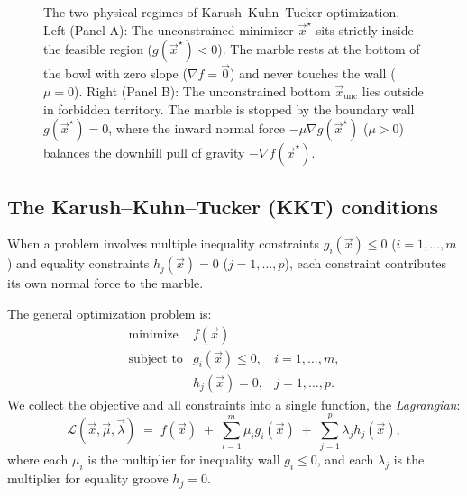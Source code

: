 \begin{figure}[H]
\caption{The two physical regimes of Karush--Kuhn--Tucker optimization. Left (Panel A): The unconstrained minimizer $\vec{x}^\star$ sits strictly inside the feasible region ($g(\vec{x}^\star) < 0$). The marble rests at the bottom of the bowl with zero slope ($\nabla f = \vec{0}$) and never touches the wall ($\mu = 0$). Right (Panel B): The unconstrained bottom $\vec{x}_{\text{unc}}$ lies outside in forbidden territory. The marble is stopped by the boundary wall $g(\vec{x}^\star) = 0$, where the inward normal force $-\mu \nabla g(\vec{x}^\star)$ ($\mu > 0$) balances the downhill pull of gravity $-\nabla f(\vec{x}^\star)$.}
\label{ch36:fig-kkt-walls}
\end{figure}

\subsection{The Karush--Kuhn--Tucker (KKT) conditions}
\label{ch36:kkt-conditions}

When a problem involves multiple inequality constraints $g_i(\vec{x}) \le 0$ ($i = 1,\dots,m$) and equality constraints $h_j(\vec{x}) = 0$ ($j = 1,\dots,p$), each constraint contributes its own normal force to the marble.

The general optimization problem is:
\[
\begin{array}{rll}
  \text{minimize} & f(\vec{x}) & \\[4pt]
  \text{subject to} & g_i(\vec{x}) \le 0, & i = 1, \dots, m, \\[2pt]
                    & h_j(\vec{x}) = 0, & j = 1, \dots, p.
\end{array}
\]
We collect the objective and all constraints into a single function, the \emph{Lagrangian}:
\[
  \mathcal{L}(\vec{x}, \vec{\mu}, \vec{\lambda}) \;=\; f(\vec{x}) \;+\; \sum_{i=1}^{m} \mu_i g_i(\vec{x}) \;+\; \sum_{j=1}^{p} \lambda_j h_j(\vec{x}),
\]
where each $\mu_i$ is the multiplier for inequality wall $g_i \le 0$, and each $\lambda_j$ is the multiplier for equality groove $h_j = 0$.


